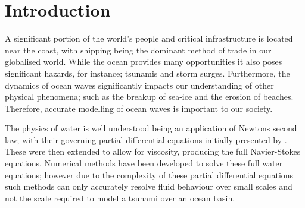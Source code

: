 
\chapter{Introduction}
\label{chp:Introduction}





A significant portion of the world's people and critical infrastructure is located near the coast, with shipping being the dominant method of trade in our globalised world. While the ocean provides many opportunities it also poses significant hazards, for instance; tsunamis and storm surges. Furthermore, the dynamics of ocean waves significantly impacts our understanding of other physical phenomena; such as the breakup of sea-ice and the erosion of beaches. Therefore, accurate modelling of ocean waves is important to our society. 

The physics of water is well understood being an application of Newtons second law; with their governing partial differential equations initially presented by \citet{Euler-1755-274}. These were then extended to allow for viscosity, producing the full Navier-Stokes equations. Numerical methods \cite{Chorin-1967-928,Taylor-Hood-1973-73,Bassi-1997-267} have been developed to solve these full water equations; however due to the complexity of these partial differential equations such methods can only accurately resolve fluid behaviour over small scales and not the scale required to model a tsunami over an ocean basin. 

